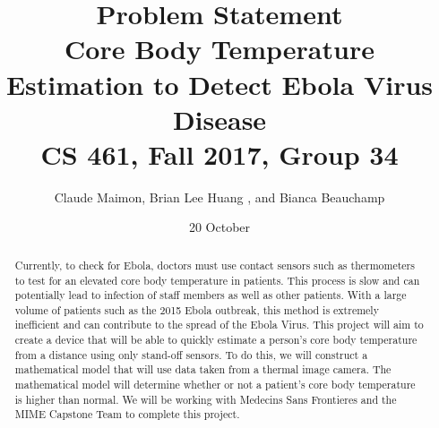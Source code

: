 \documentclass{article}
\title{%
  Problem Statement \\
  \vspace{0.4cm}
  \large Core Body Temperature Estimation to Detect Ebola Virus Disease \\
  \vspace{0.4cm}
  \large CS 461, Fall 2017, Group 34\\
    }
\author{Claude Maimon,  Brian Lee Huang , and Bianca Beauchamp}
\date{ 20 October}
\begin{document}
\maketitle


\begin{abstract}
Currently, to check for Ebola, doctors must use contact sensors such as thermometers to test for an elevated core body temperature in patients. This process is slow and can potentially lead to infection of staff members as well as other patients. With a large volume of patients such as the 2015 Ebola outbreak, this method is extremely inefficient and can contribute to the spread of the Ebola Virus. This project will aim to create a device that will be able to quickly estimate a person’s core body temperature from a distance using only stand-off sensors. To do this, we will construct a mathematical model that will use data taken from a thermal image camera. The mathematical model will determine whether or not a patient’s core body temperature is higher than normal. We will be working with Medecins Sans Frontieres and the MIME Capstone Team to complete this project.   \end{abstract}
\newpage
\end{document}
